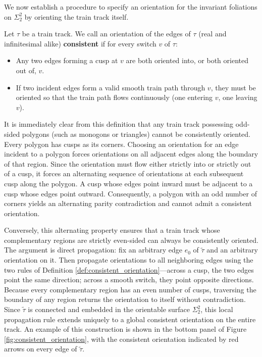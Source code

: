 We now establish a procedure to specify an orientation for the invariant foliations on $\Sigma_2^2$ by orienting the train track itself.

\begin{definition}\label{def:consistent_orientation}
    Let $\tau$ be a train track. We call an orientation of the edges of $\tau$ (real and infinitesimal alike) \textbf{consistent} if for every switch $v$ of $\tau$:
    \begin{itemize}
        \item Any two edges forming a cusp at $v$ are both oriented into, or both oriented out of, $v$.
        \item If two incident edges form a valid smooth train path through $v$, they must be oriented so that the train path flows continuously (one entering $v$, one leaving $v$).
    \end{itemize}
\end{definition}

It is immediately clear from this definition that any train track possessing odd-sided polygons (such as monogons or triangles) cannot be consistently oriented. Every polygon has cusps as its corners. Choosing an orientation for an edge incident to a polygon forces orientations on all adjacent edges along the boundary of that region. Since the orientation must flow either strictly into or strictly out of a cusp, it forces an alternating sequence of orientations at each subsequent cusp along the polygon. A cusp whose edges point inward must be adjacent to a cusp whose edges point outward. Consequently, a polygon with an odd number of corners yields an alternating parity contradiction and cannot admit a consistent orientation.

Conversely, this alternating property ensures that a train track whose complementary regions are strictly even-sided can always be consistently oriented. The argument is direct propagation: fix an arbitrary edge $e_0$ of $\tilde\tau$ and an arbitrary orientation on it. Then propagate orientations to all neighboring edges using the two rules of Definition \ref{def:consistent_orientation}---across a cusp, the two edges point the same direction; across a smooth switch, they point opposite directions. Because every complementary region has an even number of cusps, traversing the boundary of any region returns the orientation to itself without contradiction. Since $\tilde\tau$ is connected and embedded in the orientable surface $\Sigma_2^2$, this local propagation rule extends uniquely to a global consistent orientation on the entire track. An example of this construction is shown in the bottom panel of Figure \ref{fig:consistent_orientation}, with the consistent orientation indicated by red arrows on every edge of $\tilde\tau$.

